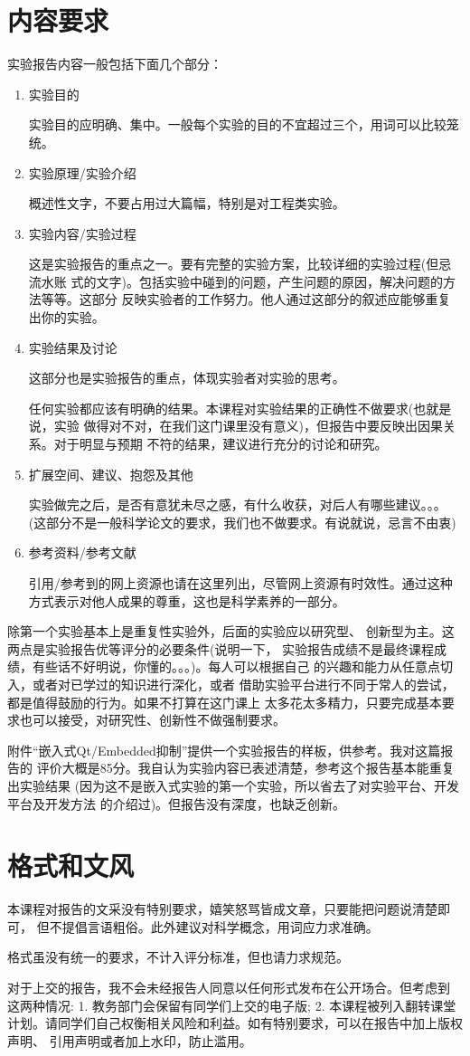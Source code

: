 \documentclass[nofonts]{ctexart}
\begin{document}
\section{内容要求}
   实验报告内容一般包括下面几个部分：
\begin{enumerate}
  \item 实验目的

  实验目的应明确、集中。一般每个实验的目的不宜超过三个，用词可以比较笼统。
  \item 实验原理/实验介绍

    概述性文字，不要占用过大篇幅，特别是对工程类实验。
  \item 实验内容/实验过程

    这是实验报告的重点之一。要有完整的实验方案，比较详细的实验过程(但忌流水账
式的文字)。包括实验中碰到的问题，产生问题的原因，解决问题的方法等等。这部分
反映实验者的工作努力。他人通过这部分的叙述应能够重复出你的实验。

  \item 实验结果及讨论

  这部分也是实验报告的重点，体现实验者对实验的思考。

  任何实验都应该有明确的结果。本课程对实验结果的正确性不做要求(也就是说，实验
做得对不对，在我们这门课里没有意义)，但报告中要反映出因果关系。对于明显与预期
  不符的结果，建议进行充分的讨论和研究。

  \item 扩展空间、建议、抱怨及其他

  实验做完之后，是否有意犹未尽之感，有什么收获，对后人有哪些建议。。。
  (这部分不是一般科学论文的要求，我们也不做要求。有说就说，忌言不由衷)

  \item 参考资料/参考文献

    引用/参考到的网上资源也请在这里列出，尽管网上资源有时效性。通过这种
	方式表示对他人成果的尊重，这也是科学素养的一部分。
\end{enumerate}

   除第一个实验基本上是重复性实验外，后面的实验应以{\color{red}研究型}、
{\color{red}创新型}为主。这两点是实验报告优等评分的必要条件(说明一下，
实验报告成绩不是最终课程成绩，有些话不好明说，你懂的。。。)。每人可以根据自己
的兴趣和能力从{\color{red}任意点}切入，或者对已学过的知识进行深化，或者
借助实验平台进行不同于常人的尝试，都是值得鼓励的行为。如果不打算在这门课上
太多花太多精力，只要完成基本要求也可以接受，对研究性、创新性不做强制要求。


   附件“嵌入式Qt/Embedded抑制”提供一个实验报告的样板，供参考。我对这篇报告的
评价大概是85分。我自认为实验内容已表述清楚，参考这个报告基本能重复出实验结果
(因为这不是嵌入式实验的第一个实验，所以省去了对实验平台、开发平台及开发方法
 的介绍过)。但报告没有深度，也缺乏创新。

\section{格式和文风}
   本课程对报告的文采没有特别要求，嬉笑怒骂皆成文章，只要能把问题说清楚即可，
但不提倡言语粗俗。此外建议对科学概念，用词应力求准确。

   格式虽没有统一的要求，不计入评分标准，但也请力求规范。

   对于上交的报告，我不会未经报告人同意以任何形式发布在公开场合。但考虑到
这两种情况: 1. 教务部门会保留有同学们上交的电子版; 2. 本课程被列入翻转课堂
计划。请同学们自己权衡相关风险和利益。如有特别要求，可以在报告中加上版权声明、
引用声明或者加上水印，防止滥用。
\end{document}
